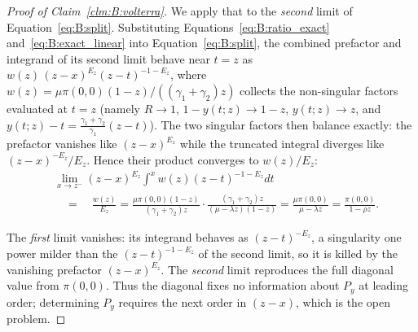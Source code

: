 \begin{proof}[Proof of Claim~\ref{clm:B:volterra}]
    We apply that to the \emph{second} limit of Equation~\eqref{eq:B:split}. Substituting Equations~\eqref{eq:B:ratio_exact} and~\eqref{eq:B:exact_linear} into Equation~\eqref{eq:B:split}, the combined prefactor and integrand of its second limit behave near $t=z$ as $w(z)\,(z-x)^{E_z}(z-t)^{-1-E_z}$, where $w(z)=\mu\pi(0,0)(1-z)/((\gamma_1+\gamma_2)z)$ collects the non-singular factors evaluated at $t=z$ (namely $R\to1$, $1-y(t;z)\to1-z$, $y(t;z)\to z$, and $y(t;z)-t=\tfrac{\gamma_1+\gamma_2}{\gamma_1}(z-t)$). The two singular factors then balance exactly: the prefactor vanishes like $(z-x)^{E_z}$ while the truncated integral diverges like $(z-x)^{-E_z}/E_z$. Hence their product converges to $w(z)/E_z$:
    \begin{align*}
        & \lim_{x\to z^-}(z-x)^{E_z}\int^{x} w(z)(z-t)^{-1-E_z}dt \\
        & \quad = \quad \frac{w(z)}{E_z}
        = \frac{\mu\pi(0,0)(1-z)}{(\gamma_1+\gamma_2)z}\cdot \frac{(\gamma_1+\gamma_2)z}{(\mu-\lambda z)(1-z)}
        = \frac{\mu\pi(0,0)}{\mu-\lambda z}
        = \frac{\pi(0,0)}{1-\rho z}.
    \end{align*}
    
    The \emph{first} limit vanishes: its integrand behaves as $(z-t)^{-E_z}$, a singularity one power milder than the $(z-t)^{-1-E_z}$ of the second limit, so it is killed by the vanishing prefactor $(z-x)^{E_z}$. The \emph{second} limit reproduces the full diagonal value from $\pi(0,0)$. Thus the diagonal fixes no information about $P_y$ at leading order; determining $P_y$ requires the next order in $(z-x)$, which is the open problem.


\end{proof}
